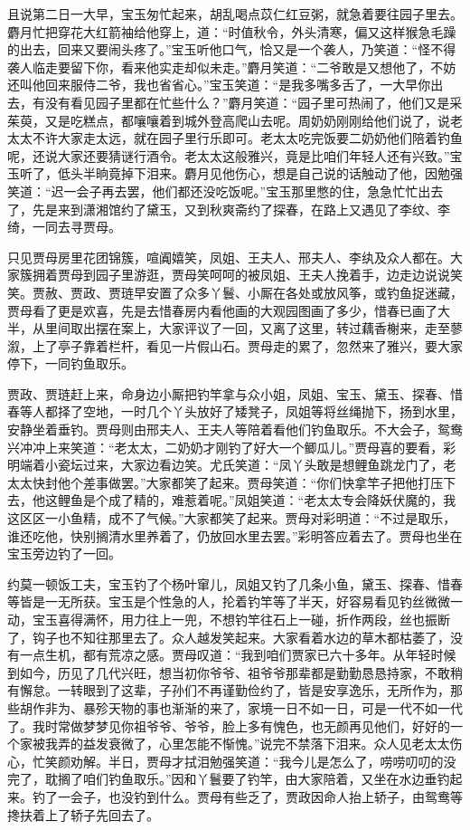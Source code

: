 \documentclass[12pt,oneside]{book}
\begin{document}
且说第二日一大早，宝玉匆忙起来，胡乱喝点苡仁红豆粥，就急着要往园子里去。麝月忙把穿花大红箭袖给他穿上，道：“时值秋令，外头清寒，偏又这样猴急毛躁的出去，回来又要闹头疼了。”宝玉听他口气，恰又是一个袭人，乃笑道：“怪不得袭人临走要留下你，看来他实走却似未走。”麝月笑道：“二爷敢是又想他了，不妨还叫他回来服侍二爷，我也省省心。”宝玉笑道：“是我多嘴多舌了，一大早你出去，有没有看见园子里都在忙些什么？”麝月笑道：“园子里可热闹了，他们又是采茱萸，又是吃糕点，都嚷嚷着到城外登高爬山去呢。周奶奶刚刚给他们说了，说老太太不许大家走太远，就在园子里行乐即可。老太太吃完饭要二奶奶他们陪着钓鱼呢，还说大家还要猜谜行酒令。老太太这般雅兴，竟是比咱们年轻人还有兴致。”宝玉听了，低头半晌竟掉下泪来。麝月见他伤心，想是自己说的话触动了他，因勉强笑道：“迟一会子再去罢，他们都还没吃饭呢。”宝玉那里憋的住，急急忙忙出去了，先是来到潇湘馆约了黛玉，又到秋爽斋约了探春，在路上又遇见了李纹、李绮，一同去寻贾母。

只见贾母房里花团锦簇，喧阗嬉笑，凤姐、王夫人、邢夫人、李纨及众人都在。大家簇拥着贾母到园子里游逛，贾母笑呵呵的被凤姐、王夫人挽着手，边走边说说笑笑。贾赦、贾政、贾琏早安置了众多丫鬟、小厮在各处或放风筝，或钓鱼捉迷藏，贾母看了更是欢喜，先是去惜春房内看他画的大观园图画了多少，惜春已画了大半，从里间取出摆在案上，大家评议了一回，又离了这里，转过藕香榭来，走至蓼溆，上了亭子靠着栏杆，看见一片假山石。贾母走的累了，忽然来了雅兴，要大家停下，一同钓鱼取乐。

贾政、贾琏赶上来，命身边小厮把钓竿拿与众小姐，凤姐、宝玉、黛玉、探春、惜春等人都择了空地，一时几个丫头放好了矮凳子，凤姐等将丝绳抛下，扬到水里，安静坐着垂钓。贾母则由邢夫人、王夫人等陪着看他们钓鱼取乐。不大会子，鸳鸯兴冲冲上来笑道：“老太太，二奶奶才刚钓了好大一个鲫瓜儿。”贾母喜的要看，彩明端着小瓷坛过来，大家边看边笑。尤氏笑道：“凤丫头敢是想鲤鱼跳龙门了，老太太快封他个差事做罢。”大家都笑了起来。贾母笑道：“你们快拿竿子把他打压下去，他这鲤鱼是个成了精的，难惹着呢。”凤姐笑道：“老太太专会降妖伏魔的，我这区区一小鱼精，成不了气候。”大家都笑了起来。贾母对彩明道：“不过是取乐，谁还吃他，快别搁清水里养着了，仍放回水里去罢。”彩明答应着去了。贾母也坐在宝玉旁边钓了一回。

约莫一顿饭工夫，宝玉钓了个杨叶窜儿，凤姐又钓了几条小鱼，黛玉、探春、惜春等皆是一无所获。宝玉是个性急的人，抡着钓竿等了半天，好容易看见钓丝微微一动，宝玉喜得满怀，用力往上一兜，不想钓竿往石上一碰，折作两段，丝也振断了，钩子也不知往那里去了。众人越发笑起来。大家看着水边的草木都枯萎了，没有一点生机，都有荒凉之感。贾母叹道：“我到咱们贾家已六十多年。从年轻时候到如今，历见了几代兴旺，想当初你爷爷、祖爷爷那辈都是勤勤恳恳持家，不敢稍有懈怠。一转眼到了这辈，子孙们不再谨勤俭约了，皆是安享逸乐，无所作为，那些胡作非为、暴殄天物的事也渐渐的来了，家境一日不如一日，可是一代不如一代了。我时常做梦梦见你祖爷爷、爷爷，脸上多有愧色，也无颜再见他们，好好的一个家被我弄的益发衰微了，心里怎能不惭愧。”说完不禁落下泪来。众人见老太太伤心，忙笑颜劝解。半日，贾母才拭泪勉强笑道：“我今儿是怎么了，唠唠叨叨的没完了，耽搁了咱们钓鱼取乐。”因和丫鬟要了钓竿，由大家陪着，又坐在水边垂钓起来。钓了一会子，也没钓到什么。贾母有些乏了，贾政因命人抬上轿子，由鸳鸯等搀扶着上了轿子先回去了。
\end{document}

